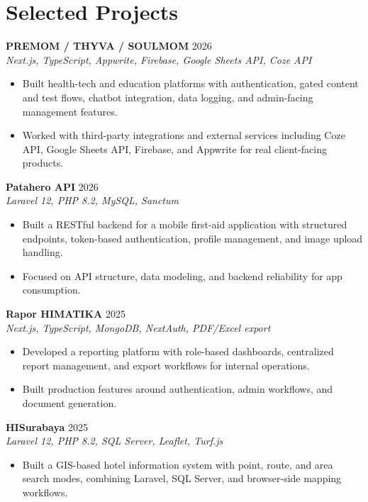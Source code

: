 \documentclass[a4paper,11pt]{article}
\begin{document}
\section*{Selected Projects}
\textbf{PREMOM / THYVA / SOULMOM} \hfill 2026 \\
\textit{Next.js, TypeScript, Appwrite, Firebase, Google Sheets API, Coze API}
\begin{itemize}
  \item Built health-tech and education platforms with authentication, gated content and test flows, chatbot integration, data logging, and admin-facing management features.
  \item Worked with third-party integrations and external services including Coze API, Google Sheets API, Firebase, and Appwrite for real client-facing products.
\end{itemize}

\textbf{Patahero API} \hfill 2026 \\
\textit{Laravel 12, PHP 8.2, MySQL, Sanctum}
\begin{itemize}
  \item Built a RESTful backend for a mobile first-aid application with structured endpoints, token-based authentication, profile management, and image upload handling.
  \item Focused on API structure, data modeling, and backend reliability for app consumption.
\end{itemize}

\textbf{Rapor HIMATIKA} \hfill 2025 \\
\textit{Next.js, TypeScript, MongoDB, NextAuth, PDF/Excel export}
\begin{itemize}
  \item Developed a reporting platform with role-based dashboards, centralized report management, and export workflows for internal operations.
  \item Built production features around authentication, admin workflows, and document generation.
\end{itemize}

\textbf{HISurabaya} \hfill 2025 \\
\textit{Laravel 12, PHP 8.2, SQL Server, Leaflet, Turf.js}
\begin{itemize}
  \item Built a GIS-based hotel information system with point, route, and area search modes, combining Laravel, SQL Server, and browser-side mapping workflows.
\end{itemize}
\end{document}
